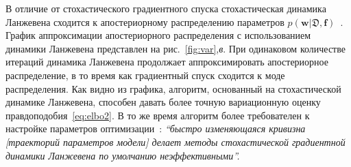 В отличие от стохастического градиентного спуска стохастическая динамика Ланжевена сходится к апостериорному распределению параметров $p(\mathbf{w}|\mathfrak{D},\mathbf{f})$~\cite{langevin, langevin_sato}.  График аппроксимации апостериорного распределения с использованием динамики Ланжевена представлен на рис.~\ref{fig:var},\textit{в}. При одинаковом количестве итераций динамика Ланжевена продолжает аппроксимировать апостериорное распределение, в то время как градиентный спуск сходится к моде распределения. {Как видно из графика, алгоритм, основанный на стохастической динамике Ланжевена, способен давать более точную вариационную оценку правдоподобия~\eqref{eq:elbo2}. В то же время алгоритм более требователен к настройке параметров оптимизации~\cite{lang_cond}: \textit{``быстро изменяющаяся кривизна [траекторий параметров модели] делает методы стохастической градиентной динамики Ланжевена по умолчанию неэффективными''.}}

